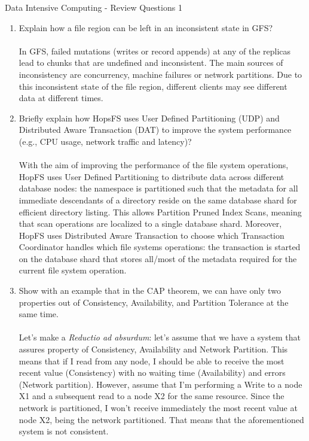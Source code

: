 \documentclass[]{report}
\begin{document}
\begin{center}
 {\Large Data Intensive Computing - Review Questions 1}
\end{center}
\vspace{1cm}
\justify
\begin{enumerate}
 \item Explain how a file region can be left in an inconsistent state in GFS?\\\\
In GFS, failed mutations (writes or record appends) at any of the replicas lead to chunks that are undefined and inconsistent. The main sources of inconsistency are concurrency, machine failures or network partitions. Due to this inconsistent state of the file region, different clients may see different data at different times.

 
 \item Briefly explain how HopsFS uses User Defined Partitioning (UDP) and Distributed Aware Transaction (DAT) to improve the system performance (e.g., CPU usage, network traffic and latency)?\\\\
With the aim of improving the performance of the file system operations, HopFS uses User Defined Partitioning to distribute data across different database nodes: the namespace is partitioned such that the metadata for all immediate descendants of a directory reside on the same database shard for efficient directory listing. This allows Partition Pruned Index Scans, meaning that scan operations are localized to a single database shard.
Moreover, HopFS uses Distributed Aware Transaction to choose which Transaction Coordinator handles which file systems operations: the transaction is started on the database shard that stores all/most of the metadata required for the current file system operation.

 
 \item Show with an example that in the CAP theorem, we can have only two properties out of Consistency, Availability, and Partition Tolerance at the same time.\\\\
Let's make a \textit{Reductio ad absurdum}: let's assume that we have a system that assures property of Consistency, Availability and Network Partition. This means that if I read from any node, I should be able to receive the most recent value (Consistency) with no waiting time (Availability) and errors (Network partition). However, assume that I'm performing a Write to a node X1 and a subsequent read to a node X2 for the same resource. Since the network is partitioned, I won't receive immediately the most recent value at node X2, being the network partitioned. That means that the aforementioned system is not consistent.
 

\end{enumerate}
\end{document}
